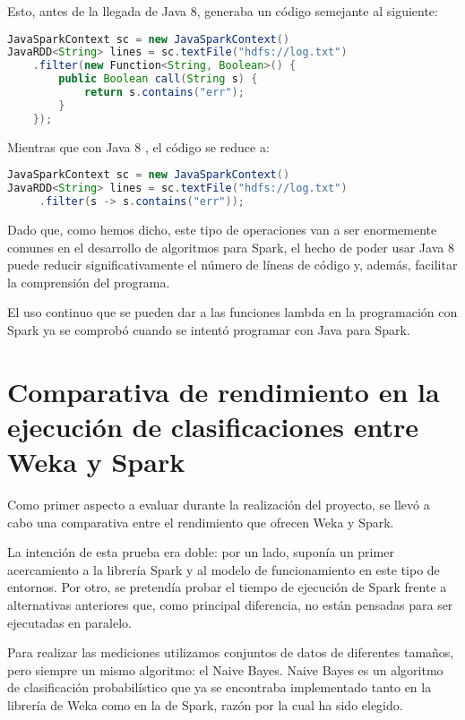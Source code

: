 Esto, antes de la llegada de Java 8, generaba un código semejante al siguiente:

\begin{lstlisting}[language=Java,tabsize=4,frame = single,caption=Código de función lambda en Java 7 \cite{Java7vs8},captionpos=b,]
JavaSparkContext sc = new JavaSparkContext()
JavaRDD<String> lines = sc.textFile("hdfs://log.txt")
	.filter(new Function<String, Boolean>() {
		public Boolean call(String s) {
			return s.contains("err");
		}
	});
\end{lstlisting}

Mientras que con Java 8 , el código se reduce a:

\begin{lstlisting}[language=Java,tabsize=4,frame = single,caption=Código de función lambda en Java 8 \cite{Java7vs8},captionpos=b,]
JavaSparkContext sc = new JavaSparkContext()
JavaRDD<String> lines = sc.textFile("hdfs://log.txt")
     .filter(s -> s.contains("err"));
\end{lstlisting}

Dado que, como hemos dicho, este tipo de operaciones van a ser enormemente comunes en el desarrollo de algoritmos para Spark, el hecho de poder usar Java 8 puede reducir significativamente el número de líneas de código y, además, facilitar la comprensión del programa.

El uso continuo que se pueden dar a las funciones lambda en la programación con Spark ya se comprobó cuando se intentó programar con Java para Spark.


\section{Comparativa de rendimiento en la ejecución de clasificaciones entre Weka y Spark}

Como primer aspecto a evaluar durante la realización del proyecto, se llevó a cabo una comparativa entre el rendimiento que ofrecen Weka y Spark.

La intención de esta prueba era doble: por un lado, suponía un primer acercamiento a la librería Spark y al modelo de funcionamiento en este tipo de entornos. Por otro, se pretendía probar el tiempo de ejecución de Spark frente a alternativas anteriores que, como principal diferencia, no están pensadas para ser ejecutadas en paralelo.

Para realizar las mediciones utilizamos conjuntos de datos de diferentes tamaños, pero siempre un mismo algoritmo: el Naive Bayes. Naive Bayes es un algoritmo de clasificación probabilístico que ya se encontraba implementado tanto en la librería de Weka \cite{John1995} como en la de Spark, razón por la cual ha sido elegido.


